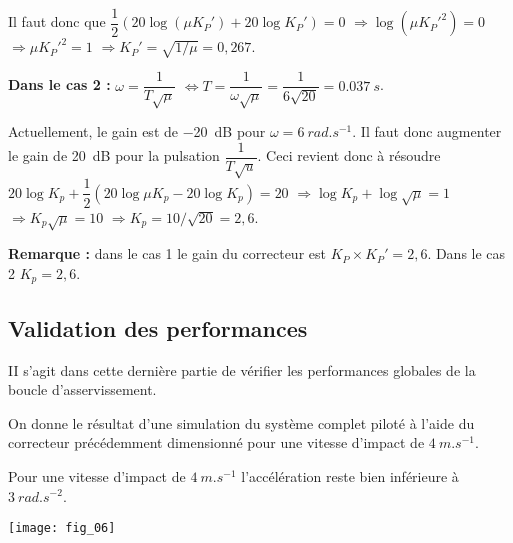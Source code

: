 \begin{multicols}{2}
\begin{multicols}{2}
\begin{corrige}
Il faut donc que $\dfrac{1}{2}\left( 20\log\left( \mu K_P'\right) + 20\log K_P'  \right)=0 $ 
$\Rightarrow \log\left( \mu K_P'^2\right)  =0$
$\Rightarrow  \mu K_P'^2 =1$
$\Rightarrow   K_P' =\sqrt{1/\mu}=0,267$.

\textbf{Dans le cas 2 :}
$\omega=\dfrac{1}{T\sqrt{\mu}}$ $ \Leftrightarrow T=\dfrac{1}{\omega\sqrt{\mu}}=\dfrac{1}{6\sqrt{20}}=\SI{0,037}{s}$.

Actuellement, le gain est de \SI{-20}{dB} pour $\omega=\SI{6}{rad.s^{-1}}$. Il faut donc augmenter le gain de \SI{20}{dB} pour la pulsation $\dfrac{1}{T\sqrt{u}}$. Ceci revient donc à résoudre 
$20\log K_p + \dfrac{1}{2}\left( 20\log \mu K_p  - 20\log K_p \right) = 20$
$\Rightarrow \log K_p +  \log \sqrt{\mu}= 1$
$\Rightarrow  K_p \sqrt{\mu}= 10$
$\Rightarrow  K_p = 10/\sqrt{20}=2,6$.

\textbf{Remarque : } dans le cas 1 le gain du correcteur est $K_P\times K_P' = 2,6$. Dans le cas 2  $K_p=2,6$. 

\end{corrige}
\else
\fi

\subsection*{Validation des performances}

\begin{obj}
II s'agit dans cette dernière partie de vérifier les performances globales de la boucle d'asservissement.
\end{obj}
\ifprof
\else
On donne le résultat d'une simulation du système complet piloté à l'aide du correcteur précédemment dimensionné pour une vitesse d'impact de $\SI{4}{m.s^{-1}}$.
\fi

\ifprof
\begin{corrige}
Pour une vitesse d'impact de $\SI{4}{m.s^{-1}}$ l'accélération reste bien inférieure à $\SI{3}{rad.s^{-2}}$.
\end{corrige}
\else
\fi

\ifprof
\else
\begin{center}
\texttt{[image: fig\_06]}
\end{center}

\fi




\ifprof
\end{multicols}
\else
\end{multicols}
\fi

%
%
%
%
%
%
